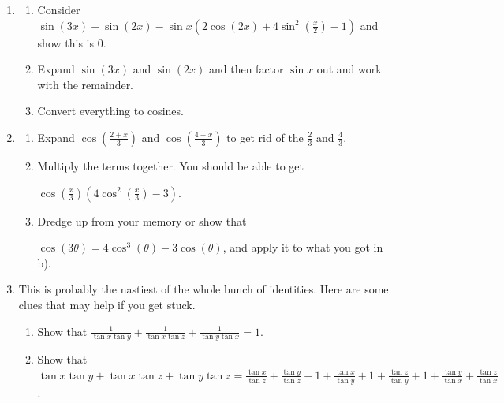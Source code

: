 \documentclass[english]{book}
\begin{document}
\begin{enumerate}
\begin{enumerate}
\begin{enumerate}[\hspace{1cm}a)]
                   $\sin x (1+2 \cos(2x) ) - \sin(3x)$. You want to show this is $0$.
                \item Expand $\sin(3x)$ and factor out $\sin x$ so that what you have left is $1+2 \cos(2x) -2 \cos^{2} x - \cos(2x)$.
                \item The expression in e) above reduces to $0$.
              \end{enumerate}
        \item \begin{enumerate}[\hspace{1cm}a)]
                \item Consider $\sin(3x) - \sin(2x) - \sin x (2 \cos(2x) + 4 \sin^{2} (\frac{x}{2} ) - 1)$ and show this is $0$.
                \item Expand $\sin(3x)$ and $\sin(2x)$ and then factor $\sin x$ out and work with the remainder.
                \item Convert everything to cosines.
              \end{enumerate}
        \item \begin{enumerate}[\hspace{1cm}a)]
                \item Expand $\cos(\frac{2+x}{3})$ and $\cos(\frac{4+x}{3})$ to get rid of the $\frac{2}{3}$ and $\frac{4}{3}$.
                \item Multiply the terms together. You should be able to get 

                   $\cos(\frac{x}{3}) (4 \cos^{2}(\frac{x}{3}) -3)$.
                \item Dredge up from your memory or show that 

                   $\cos(3\theta) = 4 \cos^{3} (\theta) - 3 \cos(\theta)$, and apply it to what you got in b).
              \end{enumerate}
        \item This is probably the nastiest of the whole bunch of identities. Here are some clues that may help if you get stuck.
              \begin{enumerate}[\hspace{1cm}a)]
                \item Show that $\frac{1}{\tan x \tan y} + \frac{1}{\tan x \tan z} + \frac{1}{\tan y \tan x} = 1$.
                \item Show that $\tan x \tan y + \tan x \tan z + \tan y \tan z = \frac{\tan x}{\tan z} + \frac{\tan y}{\tan z} + 1 + \frac{\tan x}{\tan y } + 1 + \frac{\tan z}{\tan y} + 1 + \frac{\tan y}{\tan x} + \frac{\tan z}{\tan x}$.


\end{enumerate}
\end{enumerate}
\end{enumerate}
\end{document}
